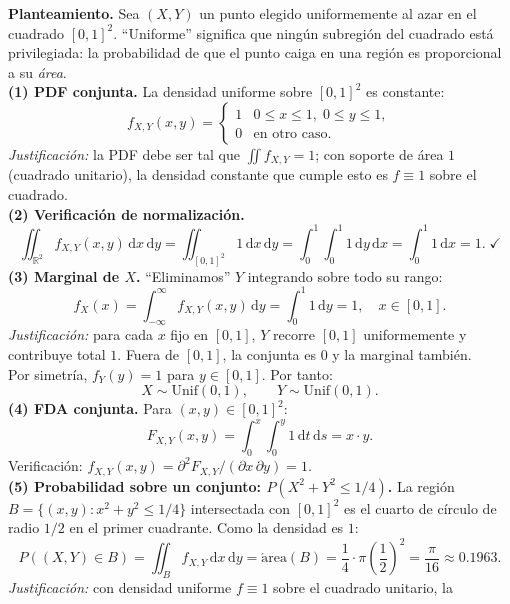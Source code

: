 \documentclass[10pt,a4paper]{article}
\numberwithin{equation}{section}
\newcommand{\R}{\mathbb{R}}
\newcounter{excount}[section]
\renewcommand{\theexcount}{\thesection.\arabic{excount}}
\newenvironment{ejemplo}[1]{%
  \refstepcounter{excount}%
  \begin{tcolorbox}[exbox, title={Ejemplo \theexcount\ \textperiodcentered\ #1}]%
}{\end{tcolorbox}}
\begin{document}
\begin{ejemplo}{Uniforme en el cuadrado unitario}
  \textbf{Planteamiento.} Sea $(X, Y)$ un punto elegido uniformemente al azar en el cuadrado
  $[0,1]^2$. ``Uniforme'' significa que ning\'un subregi\'on del cuadrado est\'a privilegiada:
  la probabilidad de que el punto caiga en una regi\'on es proporcional a su \emph{\'area}.
  \\[5pt]
  \textbf{(1) PDF conjunta.} La densidad uniforme sobre $[0,1]^2$ es constante:
  \[
    f_{X,Y}(x,y) = \begin{cases} 1 & 0 \leq x \leq 1,\; 0 \leq y \leq 1, \\ 0 & \text{en otro caso}.\end{cases}
  \]
  \emph{Justificaci\'on:} la PDF debe ser tal que $\iint f_{X,Y} = 1$; con soporte de \'area $1$
  (cuadrado unitario), la densidad constante que cumple esto es $f \equiv 1$ sobre el cuadrado.
  \\[5pt]
  \textbf{(2) Verificaci\'on de normalizaci\'on.}
  \[
    \iint_{\R^2} f_{X,Y}(x,y)\,\mathrm{d}x\,\mathrm{d}y
    = \iint_{[0,1]^2} 1\,\mathrm{d}x\,\mathrm{d}y
    = \int_0^1 \int_0^1 1\,\mathrm{d}y\,\mathrm{d}x
    = \int_0^1 1\,\mathrm{d}x = 1. \;\checkmark
  \]
  \textbf{(3) Marginal de $X$.} ``Eliminamos'' $Y$ integrando sobre todo su rango:
  \[
    f_X(x) = \int_{-\infty}^{\infty} f_{X,Y}(x,y)\,\mathrm{d}y = \int_0^1 1\,\mathrm{d}y = 1,
    \quad x \in [0,1].
  \]
  \emph{Justificaci\'on:} para cada $x$ fijo en $[0,1]$, $Y$ recorre $[0,1]$ uniformemente y
  contribuye total $1$. Fuera de $[0,1]$, la conjunta es $0$ y la marginal tambi\'en. \\
  Por simetr\'ia, $f_Y(y) = 1$ para $y \in [0,1]$. Por tanto:
  \[
    X \sim \mathrm{Unif}(0,1), \qquad Y \sim \mathrm{Unif}(0,1).
  \]
  \textbf{(4) FDA conjunta.} Para $(x,y) \in [0,1]^2$:
  \[
    F_{X,Y}(x,y) = \int_0^x \int_0^y 1\,\mathrm{d}t\,\mathrm{d}s = x\cdot y.
  \]
  Verificaci\'on: $f_{X,Y}(x,y) = \partial^2 F_{X,Y}/(\partial x\,\partial y) = 1$. \;\checkmark
  \\[5pt]
  \textbf{(5) Probabilidad sobre un conjunto: $P(X^2 + Y^2 \leq 1/4)$.}
  La regi\'on $B = \{(x,y): x^2+y^2 \leq 1/4\}$ intersectada con $[0,1]^2$ es el cuarto de
  c\'irculo de radio $1/2$ en el primer cuadrante. Como la densidad es $1$:
  \[
    P((X,Y) \in B) = \iint_B f_{X,Y}\,\mathrm{d}x\,\mathrm{d}y = \mathrm{\acute{a}rea}(B)
    = \frac{1}{4}\cdot \pi\!\left(\frac{1}{2}\right)^2 = \frac{\pi}{16} \approx 0.1963.
  \]
  \emph{Justificaci\'on:} con densidad uniforme $f \equiv 1$ sobre el cuadrado unitario, la

\end{ejemplo}
\end{document}
